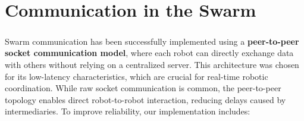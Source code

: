 \chapter{Communication in the Swarm}

\paragraph*{}
Swarm communication has been successfully implemented using a \textbf{peer-to-peer socket communication model}, where each robot can directly exchange data with others without relying on a centralized server. This architecture was chosen for its low-latency characteristics, which are crucial for real-time robotic coordination. While raw socket communication is common, the peer-to-peer topology enables direct robot-to-robot interaction, reducing delays caused by intermediaries. To improve reliability, our implementation includes:

